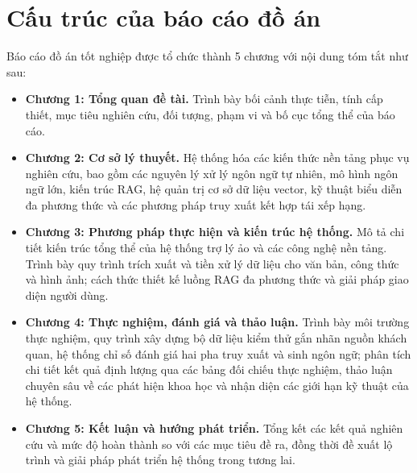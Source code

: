 \section{Cấu trúc của báo cáo đồ án}
Báo cáo đồ án tốt nghiệp được tổ chức thành 5 chương với nội dung tóm tắt như sau:

\begin{itemize}
    \item \textbf{Chương 1: Tổng quan đề tài.} Trình bày bối cảnh thực tiễn, tính cấp thiết, mục tiêu nghiên cứu, đối tượng, phạm vi và bố cục tổng thể của báo cáo.
    \item \textbf{Chương 2: Cơ sở lý thuyết.} Hệ thống hóa các kiến thức nền tảng phục vụ nghiên cứu, bao gồm các nguyên lý xử lý ngôn ngữ tự nhiên, mô hình ngôn ngữ lớn, kiến trúc RAG, hệ quản trị cơ sở dữ liệu vector, kỹ thuật biểu diễn đa phương thức và các phương pháp truy xuất kết hợp tái xếp hạng.
    \item \textbf{Chương 3: Phương pháp thực hiện và kiến trúc hệ thống.} Mô tả chi tiết kiến trúc tổng thể của hệ thống trợ lý ảo và các công nghệ nền tảng. Trình bày quy trình trích xuất và tiền xử lý dữ liệu cho văn bản, công thức và hình ảnh; cách thức thiết kế luồng RAG đa phương thức và giải pháp giao diện người dùng.
    \item \textbf{Chương 4: Thực nghiệm, đánh giá và thảo luận.} Trình bày môi trường thực nghiệm, quy trình xây dựng bộ dữ liệu kiểm thử gắn nhãn nguồn khách quan, hệ thống chỉ số đánh giá hai pha truy xuất và sinh ngôn ngữ; phân tích chi tiết kết quả định lượng qua các bảng đối chiếu thực nghiệm, thảo luận chuyên sâu về các phát hiện khoa học và nhận diện các giới hạn kỹ thuật của hệ thống.
    \item \textbf{Chương 5: Kết luận và hướng phát triển.} Tổng kết các kết quả nghiên cứu và mức độ hoàn thành so với các mục tiêu đề ra, đồng thời đề xuất lộ trình và giải pháp phát triển hệ thống trong tương lai.
\end{itemize}
